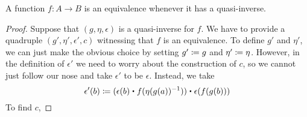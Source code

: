 \begin{thm}
A function $f:A\to B$ is an equivalence whenever it has a quasi-inverse.
\end{thm}

\begin{proof}
Suppose that $(g,\eta,\epsilon)$ is a quasi-inverse for $f$. We have to provide
a quadruple $(g',\eta',\epsilon',c)$ witnessing that $f$ is an equivalence. To
define $g'$ and $\eta'$, we can just make the obvious choice by setting $g'
\coloneqq g$ and $\eta'\coloneqq \eta$. However, in the definition of $\epsilon'$ we
need to worry about the construction of $c$, so we cannot just follow our nose
and take $\epsilon'$ to be $\epsilon$. Instead, we take
\begin{equation*}
\epsilon'(b) \defeq (\epsilon(b)\ct f(\eta(g(a))^{-1}))\ct \epsilon(f(g(b)))
\end{equation*}
To find $c$, 
\end{proof}

